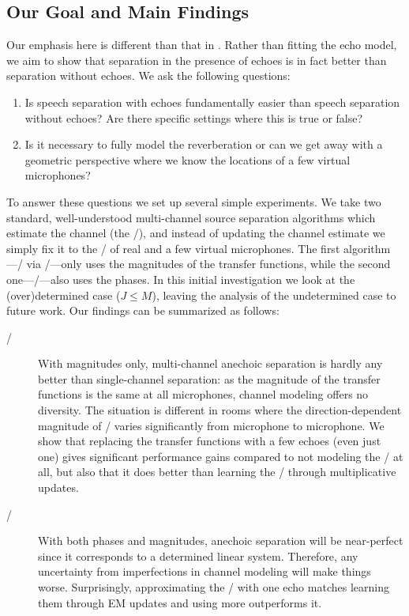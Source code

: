 \subsection{Our Goal and Main Findings}
Our emphasis here is different than that in .
Rather than fitting the echo model, we aim to show that separation in the presence of echoes is in fact better than separation without echoes.
We ask the following questions:
\begin{enumerate}
    \item Is speech separation with echoes fundamentally easier than speech separation without echoes?
    Are there specific settings where this is true or false?
    \item Is it necessary to fully model the reverberation or can we get away with a geometric perspective where we know the locations of a few virtual microphones?
\end{enumerate}
To answer these questions we set up several simple experiments.
We take two standard, well-understood multi-channel source separation algorithms which estimate the channel (the \RTFs/),
and instead of updating the channel estimate we simply fix it to the \RTFs/ of real and a few virtual microphones.
The first algorithm---\NMFdef/ via \MU/---only uses the magnitudes of the transfer functions, while the second one---\EMdef/---also uses the phases.
In this initial investigation we look at the (over)determined case ($J \leq M$),
leaving the analysis of the undetermined case to future work. Our findings can be summarized as follows:
\begin{description}
    \item[\MU/] With magnitudes only, multi-channel anechoic separation is hardly any better than single-channel separation:
    as the magnitude of the transfer functions is the same at all microphones, channel modeling offers no diversity.
    The situation is different in rooms where the direction-dependent magnitude of \RTFs/ varies significantly from microphone to microphone.
    We show that replacing the transfer functions with a few echoes (even just one) gives significant performance gains compared to not modeling the \RTFs/ at all,
    but also that it does better than learning the \RTFs/ through multiplicative updates.
    \item[\EM/] With both phases and magnitudes, anechoic separation will be near-perfect since it corresponds to a determined linear system.
    Therefore, any uncertainty from imperfections in channel modeling will make things worse.
    Surprisingly, approximating the \RTFs/ with one echo matches learning them through EM updates and using more outperforms it.
\end{description}

